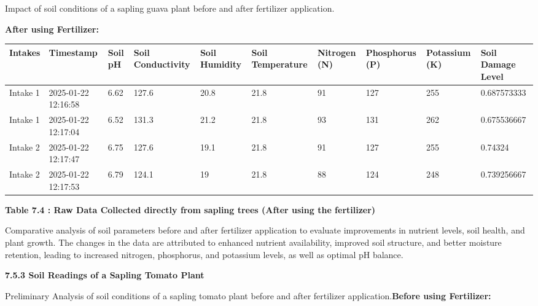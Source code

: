 \documentclass{book} %
\begin{document}
\noindent \textbf{}

\noindent \textbf{}

\noindent Impact of soil conditions of a sapling guava plant before and after fertilizer application.\textbf{}

\noindent \textbf{}

\noindent \textbf{After using Fertilizer:}

\noindent \textbf{}

\begin{tabular}{|p{0.4in}|p{0.4in}|p{0.4in}|p{0.4in}|p{0.4in}|p{0.4in}|p{0.4in}|p{0.4in}|p{0.4in}|p{0.4in}|} \hline 
Intakes & Timestamp & Soil pH & Soil Conductivity & Soil Humidity & Soil Temperature & Nitrogen (N) & Phosphorus (P) & Potassium (K) & Soil Damage Level \\ \hline 
Intake 1 & 2025-01-22 12:16:58 & 6.62 & 127.6 & 20.8 & 21.8 & 91 & 127 & 255 & 0.687573333 \\ \hline 
Intake 1 & 2025-01-22 12:17:04 & 6.52 & 131.3 & 21.2 & 21.8 & 93 & 131 & 262 & 0.675536667 \\ \hline 
Intake 2 & 2025-01-22 12:17:47 & 6.75 & 127.6 & 19.1 & 21.8 & 91 & 127 & 255 & 0.74324 \\ \hline 
Intake 2 & 2025-01-22 12:17:53 & 6.79 & 124.1 & 19 & 21.8 & 88 & 124 & 248 & 0.739256667 \\ \hline 
\end{tabular}

\textbf{Table 7.4 : Raw Data Collected directly from sapling trees (After using the fertilizer)}

\noindent \textbf{}

\noindent Comparative analysis of soil parameters before and after fertilizer application to evaluate improvements in nutrient levels, soil health, and plant growth. The changes in the data are attributed to enhanced nutrient availability, improved soil structure, and better moisture retention, leading to increased nitrogen, phosphorus, and potassium levels, as well as optimal pH balance.

\noindent \textbf{}

\noindent \textbf{7.5.3 Soil Readings of a Sapling Tomato Plant}

\noindent Preliminary Analysis of soil conditions of a sapling tomato plant before and after fertilizer application.\textbf{Before using Fertilizer:}
\end{document}

